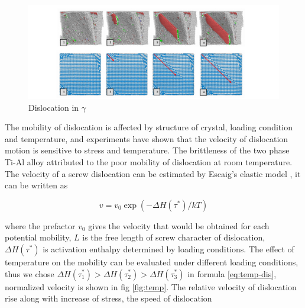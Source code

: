 \documentclass[metals,article,submit,moreauthors,pdftex,10pt,a4paper]{Definitions/mdpi}
\begin{document}
\begin{figure}[ht]
	\centering
	\includegraphics[width=1\linewidth]{"img/disl-gamma"}
	\caption{Dislocation in $\gamma$}
	\label{fig:dis-alpha_2}
\end{figure}

The mobility of dislocation is affected by structure of crystal, loading condition and temperature, and experiments have shown that the velocity of dislocation motion is sensitive to stress and temperature\cite{Stein1960}. The brittleness of the two phase Ti-Al alloy attributed to the poor mobility of dislocation at room temperature. The velocity of a screw dislocation can be estimated by Escaig's elastic model \cite{Escaig1968}, it can be written as 

\begin{equation}\label{eq:temp-dis}
v = v_0 \exp(-\Delta H(\tau^*)/kT)
\end{equation}

where the prefactor $v_0$ gives the velocity that would be obtained for each potential mobility, $L$ is the free length of screw character of dislocation, $\Delta H(\tau^*)$ is activation enthalpy determined by loading conditions. The effect of temperature on the mobility can be evaluated under different loading conditions, thus we chose  $\Delta H(\tau_1^*) > \Delta H(\tau_2^*) > \Delta H(\tau_3^*)$ in formula \ref{eq:temp-dis}, normalized velocity is shown in fig \ref{fig:temp}. The relative velocity  of dislocation rise along with increase of  stress, the speed of dislocation 
\end{document}
